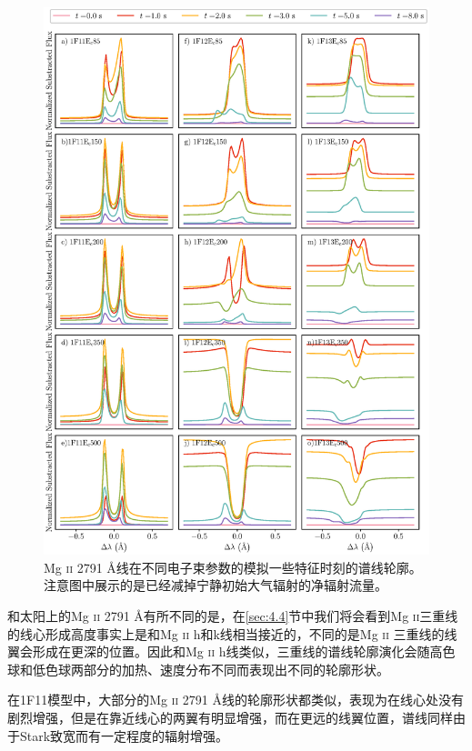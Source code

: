 \begin{figure}
	\centering
	\includegraphics[width=\textwidth]{figs/dMe_MgII2791_spec}
	\caption{Mg \textsc{ii} 2791 \mbox{\AA}线在不同电子束参数的模拟一些特征时刻的谱线轮廓。注意图中展示的是已经减掉宁静初始大气辐射的净辐射流量。}
	\label{fig:4.7}
\end{figure}

和太阳上的Mg \textsc{ii} 2791 \mbox{\AA}有所不同的是，在\ref{sec:4.4}节中我们将会看到Mg \textsc{ii}三重线的线心形成高度事实上是和Mg \textsc{ii} h和k线相当接近的，不同的是Mg \textsc{ii} 三重线的线翼会形成在更深的位置。因此和Mg \textsc{ii} h线类似，三重线的谱线轮廓演化会随高色球和低色球两部分的加热、速度分布不同而表现出不同的轮廓形状。

在1F11模型中，大部分的Mg \textsc{ii} 2791 \mbox{\AA}线的轮廓形状都类似，表现为在线心处没有剧烈增强，但是在靠近线心的两翼有明显增强，而在更远的线翼位置，谱线同样由于Stark致宽而有一定程度的辐射增强。

